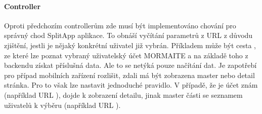 \documentclass[thesis=M,czech]{FITthesis}[2012/06/26]
\begin{document}
\paragraph{Controller}
Oproti předchozím controllerům zde musí být implementováno chování pro správný chod SplitApp aplikace. To obnáší vyčítání parametrů z URL z důvodu zjištění, jestli je nějaký konkrétní uživatel již vybrán. Příkladem může být cesta , ze které lze poznat vybraný uživatelský účet MORMAITE a na základě toho z backendu získat příslušná data. Ale to se netýká pouze načítání dat. Je zapotřebí pro případ mobilních zařízení rozlišit, zdali má být zobrazena master nebo detail stránka. Pro to však lze nastavit jednoduché pravidlo. V případě, že je účet znám (například URL ), dojde k zobrazení detailu, jinak master části se seznamem uživatelů k výběru (například URL ).
\end{document}
